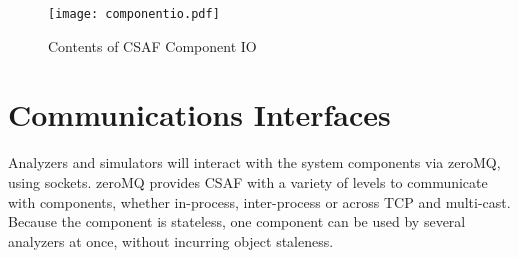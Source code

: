\begin{figure}
\centering
\texttt{[image: componentio.pdf]}
\caption{Contents of CSAF Component IO}
\label{fig:cio}
\end{figure}

\section{Communications Interfaces}

Analyzers and simulators will interact with the system components via zeroMQ, using sockets. zeroMQ provides CSAF with a variety of levels to communicate with components, whether in-process, inter-process or across TCP and multi-cast. Because the component is stateless, one component can be used by several analyzers at once, without incurring object staleness.

